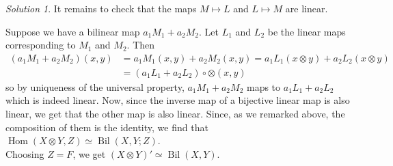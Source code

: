 \documentclass[reqno]{amsart}
\theoremstyle{definition}
\theoremstyle{remark}
\newtheorem*{solution}{Solution}
\DeclareMathOperator{\Hom}{Hom}
\DeclareMathOperator{\Bil}{Bil}
\begin{document}
\begin{solution}
        It remains to check that the maps
        $M \mapsto L$ and $L \mapsto M$ are linear.

        Suppose we have a bilinear map
        $a_1 M_1 + a_2 M_2$. Let $L_1$ and $L_2$ be
        the linear maps corresponding to $M_1 $ and $M_2$. Then
        \begin{align*}
            \left( a_1 M_1+ a_2 M_2 \right) (x,y)
            &=
            a_1 M_1(x,y) + a_2 M_2(x,y)
            = a_1 L_1 (x \otimes y) + a_2 L_2 \left( x \otimes y
            \right)\\
            &= \left( a_1 L_1 + a_2 L_2
             \right) \circ \otimes (x,y)
        \end{align*}
        so by uniqueness of the universal property,
        $a_1 M_1 + a_2 M_2$ maps to
        $a_1 L_1 + a_2 L_2$ which is indeed linear.
        Now, since the inverse map of a bijective linear map
        is also linear, we get that
        the other map is also linear. Since, as
        we remarked above, the composition of them
        is the identity, we find that
        $\Hom \left( X \otimes Y , Z \right) \simeq
        \Bil \left( X, Y ; Z \right) $.\\

        Choosing $Z = F$, we get
        $\left( X \otimes Y \right) ' \simeq
        \Bil (X,Y)$.
        


    \end{solution}









\end{document}
